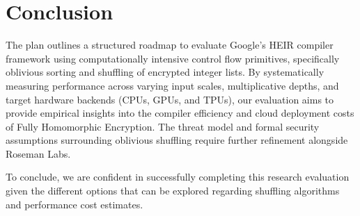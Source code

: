 \section{Conclusion}
The  plan outlines a structured roadmap to evaluate Google’s HEIR compiler framework using computationally intensive control flow primitives, specifically oblivious sorting and shuffling of encrypted integer lists. By systematically measuring performance across varying input scales, multiplicative depths, and target hardware backends (CPUs, GPUs, and TPUs), our evaluation aims to provide empirical insights into the compiler efficiency and cloud deployment costs of Fully Homomorphic Encryption. The threat model and formal security assumptions surrounding oblivious shuffling require further refinement alongside Roseman Labs.

To conclude, we are confident in successfully completing this research evaluation given the different options that can be explored regarding shuffling algorithms and performance cost estimates.